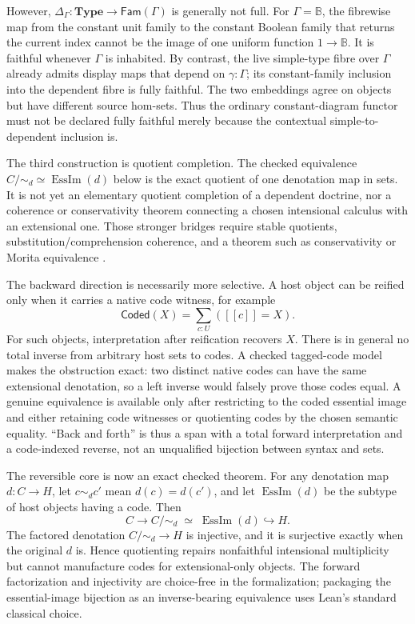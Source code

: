 \documentclass[11pt]{article}
\theoremstyle{definition}
\theoremstyle{remark}
\newcommand{\sem}[1]{[\![#1]\!]}
\begin{document}
However, $\Delta_\Gamma:\mathbf{Type}\to\mathsf{Fam}(\Gamma)$ is generally
not full.  For $\Gamma=\mathbb B$, the fibrewise map from the constant unit
family to the constant Boolean family that returns the current index cannot be
the image of one uniform function $1\to\mathbb B$.  It is faithful whenever
$\Gamma$ is inhabited.  By contrast, the live simple-type fibre over $\Gamma$
already admits display maps that depend on $\gamma:\Gamma$; its
constant-family inclusion into the dependent fibre is fully faithful.  The two
embeddings agree on objects but have different source hom-sets.  Thus the
ordinary constant-diagram functor must not be declared fully faithful merely
because the contextual simple-to-dependent inclusion is.

The third construction is quotient completion.  The checked equivalence
$C/{\sim_d}\simeq\operatorname{EssIm}(d)$ below is the exact quotient of one
denotation map in sets.  It is not yet an elementary quotient completion of a
dependent doctrine, nor a coherence or conservativity theorem connecting a
chosen intensional calculus with an extensional one.  Those stronger bridges
require stable quotients, substitution/comprehension coherence, and a theorem
such as conservativity or Morita equivalence
\cite{MaiettiRosoliniQuotient,BocquetCoherence,KapulkinLiExtensional}.

The backward direction is necessarily more selective.  A host object can be
reified only when it carries a native code witness, for example
\[
  \mathsf{Coded}(X)=
    \sum_{c:U}(\sem c=X).
\]
For such objects, interpretation after reification recovers $X$.  There is in
general no total inverse from arbitrary host sets to codes.  A checked tagged-code
model makes the obstruction exact: two distinct native codes can have the same
extensional denotation, so a left inverse would falsely prove those codes equal.
A genuine equivalence is available only after restricting to the coded
essential image and either retaining code witnesses or quotienting codes by the
chosen semantic equality.  ``Back and forth'' is thus a span with a total
forward interpretation and a code-indexed reverse, not an unqualified
bijection between syntax and sets.

The reversible core is now an exact checked theorem.  For any denotation map
$d:C\to H$, let $c\sim_d c'$ mean $d(c)=d(c')$, and let
$\operatorname{EssIm}(d)$ be the subtype of host objects having a code.  Then
\[
 C\longrightarrow C/{\sim_d}
   \;\simeq\;\operatorname{EssIm}(d)
   \hookrightarrow H.                                   \tag{C}
\]
The factored denotation $C/{\sim_d}\to H$ is injective, and it is surjective
exactly when the original $d$ is.  Hence quotienting repairs nonfaithful
intensional multiplicity but cannot manufacture codes for extensional-only
objects.  The forward factorization and injectivity are choice-free in the
formalization; packaging the essential-image bijection as an inverse-bearing
equivalence uses Lean's standard classical choice.
\end{document}
